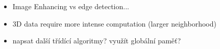 \documentclass[oneside]{article}
\begin{document}
\begin{itemize}
    \item Image Enhancing vs edge detection...
    \item 3D data require more intense computation (larger neighborhood)
    \item napsat další třídící algoritmy? využít globální paměť?
\end{itemize}
\end{document}
